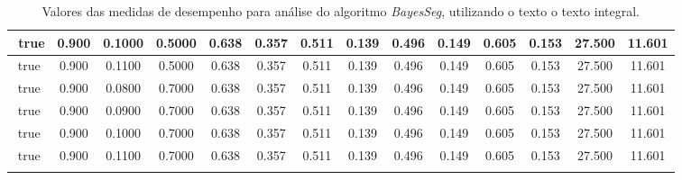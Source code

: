 \begin{longtable}[c]{|c|c|c|c|c|c|c|c|c|c|c|c|c|c|}
$$  true & 0.900 & 0.1000 & 0.5000 & 0.638 & 0.357 & 0.511 & 0.139 & 0.496 & 0.149 & 0.605 & 0.153 & 27.500 & 11.601  \\ \hline 
  true & 0.900 & 0.1100 & 0.5000 & 0.638 & 0.357 & 0.511 & 0.139 & 0.496 & 0.149 & 0.605 & 0.153 & 27.500 & 11.601  \\ \hline 
  true & 0.900 & 0.0800 & 0.7000 & 0.638 & 0.357 & 0.511 & 0.139 & 0.496 & 0.149 & 0.605 & 0.153 & 27.500 & 11.601  \\ \hline 
  true & 0.900 & 0.0900 & 0.7000 & 0.638 & 0.357 & 0.511 & 0.139 & 0.496 & 0.149 & 0.605 & 0.153 & 27.500 & 11.601  \\ \hline 
  true & 0.900 & 0.1000 & 0.7000 & 0.638 & 0.357 & 0.511 & 0.139 & 0.496 & 0.149 & 0.605 & 0.153 & 27.500 & 11.601  \\ \hline 
  true & 0.900 & 0.1100 & 0.7000 & 0.638 & 0.357 & 0.511 & 0.139 & 0.496 & 0.149 & 0.605 & 0.153 & 27.500 & 11.601  \\ \hline 
 \caption{Valores das medidas de desempenho para análise do algoritmo \textit{BayesSeg}, utilizando o texto o texto integral.}
 \end{longtable} 


